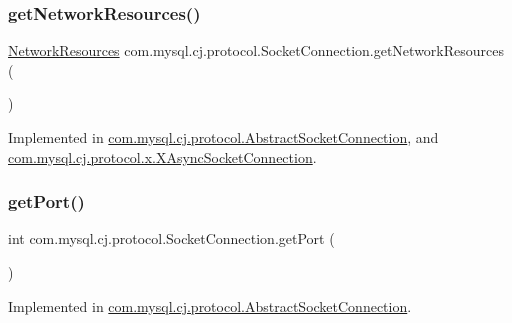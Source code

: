 \subsubsection{\texorpdfstring{get\+Network\+Resources()}{getNetworkResources()}}
{\footnotesize\ttfamily \mbox{\hyperlink{classcom_1_1mysql_1_1cj_1_1protocol_1_1_network_resources}{Network\+Resources}} com.\+mysql.\+cj.\+protocol.\+Socket\+Connection.\+get\+Network\+Resources (\begin{DoxyParamCaption}{ }\end{DoxyParamCaption})}



Implemented in \mbox{\hyperlink{classcom_1_1mysql_1_1cj_1_1protocol_1_1_abstract_socket_connection_a4352de9fb88c8ee51a26347fb3d680ec}{com.\+mysql.\+cj.\+protocol.\+Abstract\+Socket\+Connection}}, and \mbox{\hyperlink{classcom_1_1mysql_1_1cj_1_1protocol_1_1x_1_1_x_async_socket_connection_a99b18cbdd06e398d4c1e25ea6172e1c2}{com.\+mysql.\+cj.\+protocol.\+x.\+X\+Async\+Socket\+Connection}}.

\mbox{\label{interfacecom_1_1mysql_1_1cj_1_1protocol_1_1_socket_connection_afb84b242933a9707222f246fd64dffb1}} 
\subsubsection{\texorpdfstring{get\+Port()}{getPort()}}
{\footnotesize\ttfamily int com.\+mysql.\+cj.\+protocol.\+Socket\+Connection.\+get\+Port (\begin{DoxyParamCaption}{ }\end{DoxyParamCaption})}



Implemented in \mbox{\hyperlink{classcom_1_1mysql_1_1cj_1_1protocol_1_1_abstract_socket_connection_aab3a20dd6812f375dfa5050f8c056384}{com.\+mysql.\+cj.\+protocol.\+Abstract\+Socket\+Connection}}.

\mbox{\label{interfacecom_1_1mysql_1_1cj_1_1protocol_1_1_socket_connection_a2adfa33e4b622f762a0b6c820621a8a7}} 
